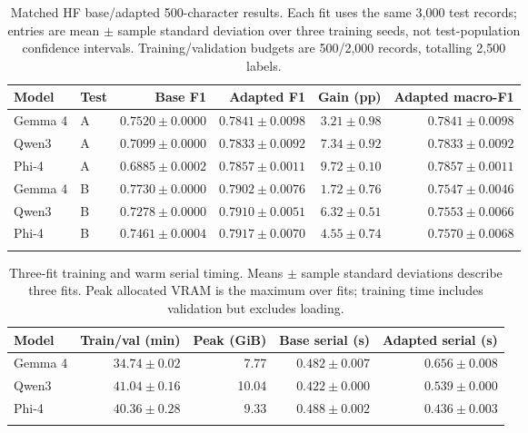 \begin{table}[tb]
\centering\scriptsize
\caption{Matched HF base/adapted 500-character results. Each fit uses the
same 3,000 test records; entries are mean $\pm$ sample standard deviation
over three training seeds, not test-population confidence intervals.
Training/validation budgets are 500/2,000 records, totalling 2,500 labels.}
\label{tab:qlora_paired}
\setlength{\tabcolsep}{2pt}
\begin{tabular}{llrrrr}\toprule
Model & Test & Base F1 & Adapted F1 & Gain (pp) & Adapted macro-F1 \\\midrule
Gemma 4 & A & $0.7520\pm0.0000$ & $0.7841\pm0.0098$ & $3.21\pm0.98$ & $0.7841\pm0.0098$ \\
Qwen3 & A & $0.7099\pm0.0000$ & $0.7833\pm0.0092$ & $7.34\pm0.92$ & $0.7833\pm0.0092$ \\
Phi-4 & A & $0.6885\pm0.0002$ & $0.7857\pm0.0011$ & $9.72\pm0.10$ & $0.7857\pm0.0011$ \\
Gemma 4 & B & $0.7730\pm0.0000$ & $0.7902\pm0.0076$ & $1.72\pm0.76$ & $0.7547\pm0.0046$ \\
Qwen3 & B & $0.7278\pm0.0000$ & $0.7910\pm0.0051$ & $6.32\pm0.51$ & $0.7553\pm0.0066$ \\
Phi-4 & B & $0.7461\pm0.0004$ & $0.7917\pm0.0070$ & $4.55\pm0.74$ & $0.7570\pm0.0068$ \\
\botrule\end{tabular}\end{table}
\begin{table}[tb]
\centering\scriptsize
\caption{Three-fit training and warm serial timing. Means $\pm$ sample
standard deviations describe three fits. Peak allocated VRAM is the
maximum over fits; training time includes validation but excludes loading.}
\label{tab:qlora_resources}
\begin{tabular}{lrrrr}\toprule
Model & Train/val (min) & Peak (GiB) & Base serial (s) & Adapted serial (s) \\\midrule
Gemma 4 & $34.74\pm0.02$ & 7.77 & $0.482\pm0.007$ & $0.656\pm0.008$ \\
Qwen3 & $41.04\pm0.16$ & 10.04 & $0.422\pm0.000$ & $0.539\pm0.000$ \\
Phi-4 & $40.36\pm0.28$ & 9.33 & $0.488\pm0.002$ & $0.436\pm0.003$ \\
\botrule\end{tabular}\end{table}
